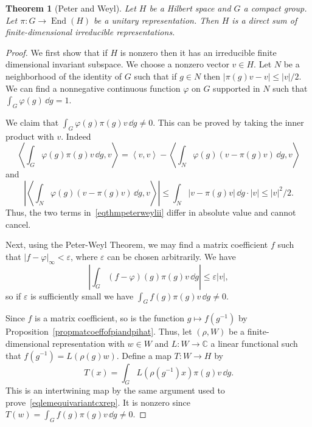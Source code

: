 \documentclass[12pt,reqno]{book}%
\newtheorem{theorem}{Theorem}[chapter]
\theoremstyle{definition}
\theoremstyle{remark}
\theoremstyle{theorem}
\theoremstyle{remark}
\renewcommand{\d}{\dd}
\DeclareMathOperator{\End}{End}
\begin{document}
\begin{theorem}[Peter and Weyl]\label{thmpeterweylii}%
    Let $H$ be a Hilbert space and $G$ a compact group.
    Let $\pi : G \to \End(H)$ be a unitary representation.
Then $H$ is a direct sum of finite-dimensional irreducible representations.
\end{theorem}%
\begin{proof}%
    We first show that if $H$ is nonzero then it has an irreducible finite dimensional invariant subspace.
    We choose a nonzero vector $v \in H$.
    Let $N$ be a neighborhood of the identity of $G$ such that if $g \in N$ then $|\pi(g)v - v| \leq |v|/2$.
    We can find a nonnegative continuous function $\varphi$ on $G$ supported in $N$ such that $\int_{G} \varphi(g) \, \d g = 1$.

    We claim that $\int_{G} \varphi(g) \pi(g)v \, \d g \neq 0$.
    This can be proved by taking the inner product with $v$.
    Indeed
    \begin{equation}\label{eqthmpeterweylii}
        {\left\langle \int_{G} \varphi(g) \pi(g)v \, \d g, v\right\rangle} = {\left\langle v, v\right\rangle} - {\left\langle \int_{N} \varphi(g)(v - \pi(g)v) \, \d g, v\right\rangle}
    \end{equation}
    and
    \[
        {\left|{\left\langle \int_{N} \varphi(g)(v - \pi(g)v) \, \d g, v\right\rangle}\right|} \leq \int_{N}|v - \pi(g)v| \, \d g \cdot |v| \leq |v|^2/2.
    \]
    Thus, the two terms in~\eqref{eqthmpeterweylii} differ in absolute value and cannot cancel.

    Next, using the Peter-Weyl Theorem, we may find a matrix coefficient $f$ such that $|f - \varphi|_\infty < \varepsilon$, where $\varepsilon$ can be chosen arbitrarily.
    We have
    \[
        {\left|\int_{G} (f - \varphi)(g) \pi(g) v \, \d g\right|} \leq \varepsilon |v|,
    \]
    so if $\varepsilon$ is sufficiently small we have $\int_{G} f(g) \pi(g)v \, \d g \neq 0$.

    Since $f$ is a matrix coefficient, so is the function $g \mapsto f(g^{-1})$ by Proposition~\ref{propmatcoeffofpiandpihat}.
    Thus, let $(\rho, W)$ be a finite-dimensional representation with $w \in W$ and $L : W \to \mathbb{C}$ a linear functional such that $f(g^{-1}) = L(\rho(g)w)$.
    Define a map $T : W \to H$ by
    \[
        T(x) = \int_{G} L(\rho(g^{-1})x) \pi(g)v \, \d g.
    \]
    This is an intertwining map by the same argument used to prove~\eqref{eqlemequivariantcxrep}.
    It is nonzero since $T(w) = \int_{G} f(g) \pi(g)v \, \d g \neq 0$.


\end{proof}
\end{document}
